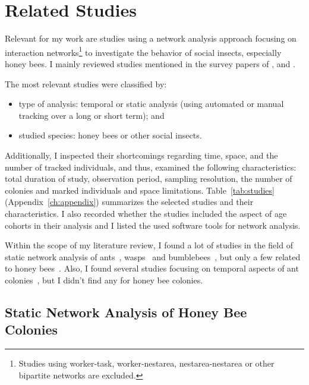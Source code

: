 \section{Related Studies}
\label{ch:relatedwork}

Relevant for my work are studies using a network analysis approach focusing on interaction networks\footnote{Studies using worker-task, worker-nestarea, nestarea-nestarea or other bipartite networks are excluded.} to investigate the behavior of social insects, especially honey bees.
I mainly reviewed studies mentioned in the survey papers of \textcite{Pinter-Wollman2014}, \textcite[chapter~15]{krause2014animal} and \textcite{charbonneau2013social}.

The most relevant studies were classified by:

\begin{itemize}
\item type of analysis: temporal or static analysis (using automated or manual tracking over a long or short term); and
\item studied species: honey bees or other social insects.
\end{itemize}

Additionally, I inspected their shortcomings regarding time, space, and the number of tracked individuals, and thus, examined the following characteristics: total duration of study, observation period, sampling resolution, the number of colonies and marked individuals and space limitations.
Table~\ref{tab:studies} (Appendix~\ref{ch:appendix}) summarizes the selected studies and their characteristics.
I also recorded whether the studies included the aspect of age cohorts in their analysis and I listed the used software tools for network analysis.


Within the scope of my literature review, I found a lot of studies in the field of static network analysis of ants~\cite{greenwald2015ant,pinter2011effect,quevillon2015social,formica2012fitness,waters2012information,sendova2010emergency}, wasps~\cite{naug2009structure} and bumblebees~\cite{otterstatter2007contact}, but only a few related to honey bees~\cite{baracchi2014socio,naug2008structure,scholl2011olfactory,naug2007experimentally}.
Also, I found several studies focusing on temporal aspects of ant colonies~\cite{mersch2013tracking,blonder2011time,jeanson2012long}, but I didn't find any for honey bee colonies.


\subsection{Static Network Analysis of Honey Bee Colonies}

